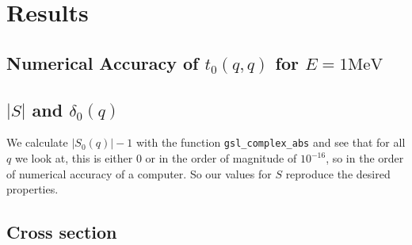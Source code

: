 \documentclass{scrartcl}
\begin{document}

\section{Results}
\subsection{Numerical Accuracy of $t_0(q,q)$ for $E=1\si{\mega\electronvolt}$}

\subsection{$|S|$ and $\delta_0(q)$}
We calculate $|S_0(q)|-1$ with the function \texttt{gsl\_complex\_abs} and see that for all $q$ we look at, this is either 0 or in the order of magnitude of $10^{-16}$, so in the order of numerical accuracy of a computer. So our values for $S$ reproduce the desired properties. 

\subsection{Cross section}

\newpage
\listoffigures
\listoftables
\printbibliography
\end{document}

